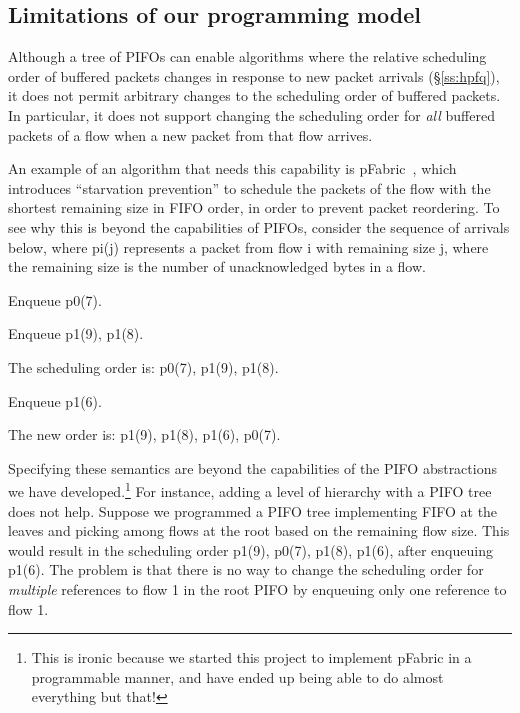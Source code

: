 
\subsection{Limitations of our programming model}
\label{pifo_ss:limitations}

Although a tree of PIFOs can enable algorithms where the relative scheduling order
of buffered packets changes in response to new packet arrivals (\S\ref{ss:hpfq}), it
does not permit arbitrary changes to the scheduling order of buffered
packets. In particular, it does not support changing the scheduling
order for {\em all} buffered packets of a flow when a new packet from
that flow arrives.

An example of an algorithm that needs this capability is
pFabric~\cite{pFabric}, which introduces ``starvation prevention'' to
schedule the packets of the flow with the shortest remaining size in
FIFO order, in order to prevent packet reordering. To see why this is beyond
the capabilities of PIFOs, consider the sequence of arrivals below,
where pi(j) represents a packet from flow i with remaining size j,
where the remaining size is the number of unacknowledged bytes in a flow.
\begin{CompactEnumerate}
\item Enqueue p0(7).
\item Enqueue p1(9), p1(8).
\item The scheduling order is: p0(7), p1(9), p1(8).
\item Enqueue p1(6).
\item The new order is: p1(9), p1(8), p1(6), p0(7).
\end{CompactEnumerate}

Specifying these semantics are beyond the capabilities of the PIFO
abstractions we have developed.\footnote{This is ironic because we
  started this project to implement pFabric in a programmable manner, and
  have ended up being able to do almost everything but that!} For
instance, adding a level of hierarchy with a PIFO tree does not
help. Suppose we programmed a PIFO tree implementing FIFO at the
leaves and picking among flows at the root based on the remaining flow
size. This would result in the scheduling order p1(9), p0(7), p1(8),
p1(6), after enqueuing p1(6). The problem is that there is no way to
change the scheduling order for {\em multiple} references to flow 1 in the
root PIFO by enqueuing only one reference to flow 1.

